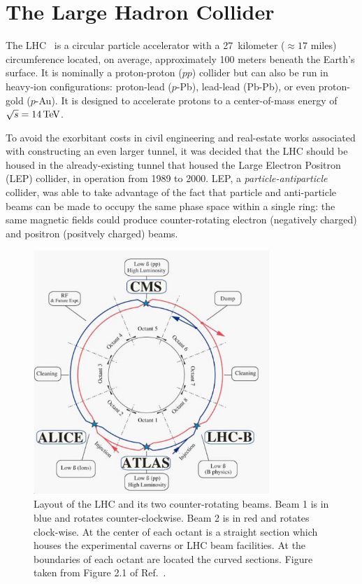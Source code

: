\section{The Large Hadron Collider}
\label{sec:lhc}

The LHC~\cite{Evans_2008} is a circular particle accelerator with a 27~kilometer ($\approx17$ miles)
circumference located, on average, approximately 100 meters beneath the Earth's surface. It is nominally
a proton-proton ($pp$) collider
but can also be run in heavy-ion configurations: proton-lead ($p$-Pb), lead-lead (Pb-Pb), or even
proton-gold ($p$-Au). It is designed to accelerate protons to a center-of-mass
energy of $\sqrt{s} = 14\,\text{Te\kern -0.1em V}$.

To avoid the exorbitant costs in civil engineering and real-estate works associated with
constructing an even larger tunnel, it was decided that the LHC should be housed in the already-existing
tunnel that housed the Large Electron Positron (LEP) collider, in operation from 1989 to 2000.
LEP, a \textit{particle-antiparticle} collider, was able to take advantage of the fact that
 particle and anti-particle beams can be made to occupy the same phase space within a single ring: the same magnetic
fields could produce counter-rotating electron (negatively charged) and positron (positvely charged) beams.



\begin{figure}[!htb]
    \begin{center}
        \includegraphics[width=0.8\textwidth]{figures/chapter2/lhc_layout}
        \caption{
            Layout of the LHC and its two counter-rotating beams. Beam 1 is in blue and rotates
            counter-clockwise. Beam 2 is in red and rotates clock-wise.
            At the center of each octant is a straight section which houses
            the experimental caverns or LHC beam facilities.
            At the boundaries of each octant are located the curved sections.
            Figure taken from Figure 2.1 of Ref.~\cite{Evans_2008}.
        }
        \label{fig:lhc_layout}
    \end{center}
\end{figure}

